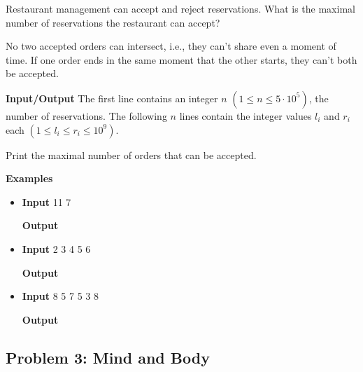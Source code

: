 \normalfont\documentclass[letterpaper,11pt]{article}
\begin{document}
Restaurant management can accept and reject reservations. What is the maximal number of reservations the restaurant can accept?

No two accepted orders can intersect, i.e., they can't share even a moment of time. If one order ends in the same moment that the other starts, they can't both be accepted.

\textbf{Input/Output} \newline
The first line contains an integer $n$ $(1 \leq n \leq 5 \cdot 10^5)$, the number of reservations. The following $n$ lines contain the integer values $l_i$ and $r_i$ each $(1 \leq l_i \leq r_i \leq 10^9)$.

Print the maximal number of orders that can be accepted.

\textbf{Examples}
\begin{itemize}
\item \textbf{Input}   11  7

\textbf{Output} 

\item \textbf{Input}   2  3  4  5  6

\textbf{Output} 

\item \textbf{Input}   8  5  7  5  3  8

\textbf{Output} 
\end{itemize}


\newpage

\subsection*{Problem 3: Mind and Body}
\end{document}
